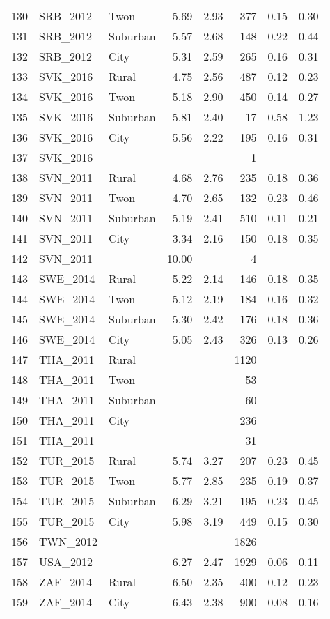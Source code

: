 \documentclass[12pt, titlepage]{article}
\begin{document}
\begin{longtable}[H]{rllrrrrr}
		130 & SRB\_2012 & Twon & 5.69 & 2.93 & 377 & 0.15 & 0.30 \\ 
		131 & SRB\_2012 & Suburban & 5.57 & 2.68 & 148 & 0.22 & 0.44 \\ 
		132 & SRB\_2012 & City & 5.31 & 2.59 & 265 & 0.16 & 0.31 \\ 
		133 & SVK\_2016 & Rural & 4.75 & 2.56 & 487 & 0.12 & 0.23 \\ 
		134 & SVK\_2016 & Twon & 5.18 & 2.90 & 450 & 0.14 & 0.27 \\ 
		135 & SVK\_2016 & Suburban & 5.81 & 2.40 &  17 & 0.58 & 1.23 \\ 
		136 & SVK\_2016 & City & 5.56 & 2.22 & 195 & 0.16 & 0.31 \\ 
		137 & SVK\_2016 &  &  &  &   1 &  &  \\ 
		138 & SVN\_2011 & Rural & 4.68 & 2.76 & 235 & 0.18 & 0.36 \\ 
		139 & SVN\_2011 & Twon & 4.70 & 2.65 & 132 & 0.23 & 0.46 \\ 
		140 & SVN\_2011 & Suburban & 5.19 & 2.41 & 510 & 0.11 & 0.21 \\ 
		141 & SVN\_2011 & City & 3.34 & 2.16 & 150 & 0.18 & 0.35 \\ 
		142 & SVN\_2011 &  & 10.00 &  &   4 &  &  \\ 
		143 & SWE\_2014 & Rural & 5.22 & 2.14 & 146 & 0.18 & 0.35 \\ 
		144 & SWE\_2014 & Twon & 5.12 & 2.19 & 184 & 0.16 & 0.32 \\ 
		145 & SWE\_2014 & Suburban & 5.30 & 2.42 & 176 & 0.18 & 0.36 \\ 
		146 & SWE\_2014 & City & 5.05 & 2.43 & 326 & 0.13 & 0.26 \\ 
		147 & THA\_2011 & Rural &  &  & 1120 &  &  \\ 
		148 & THA\_2011 & Twon &  &  &  53 &  &  \\ 
		149 & THA\_2011 & Suburban &  &  &  60 &  &  \\ 
		150 & THA\_2011 & City &  &  & 236 &  &  \\ 
		151 & THA\_2011 &  &  &  &  31 &  &  \\ 
		152 & TUR\_2015 & Rural & 5.74 & 3.27 & 207 & 0.23 & 0.45 \\ 
		153 & TUR\_2015 & Twon & 5.77 & 2.85 & 235 & 0.19 & 0.37 \\ 
		154 & TUR\_2015 & Suburban & 6.29 & 3.21 & 195 & 0.23 & 0.45 \\ 
		155 & TUR\_2015 & City & 5.98 & 3.19 & 449 & 0.15 & 0.30 \\ 
		156 & TWN\_2012 &  &  &  & 1826 &  &  \\ 
		157 & USA\_2012 &  & 6.27 & 2.47 & 1929 & 0.06 & 0.11 \\ 
		158 & ZAF\_2014 & Rural & 6.50 & 2.35 & 400 & 0.12 & 0.23 \\ 
		159 & ZAF\_2014 & City & 6.43 & 2.38 & 900 & 0.08 & 0.16 \\ 
		\hline
	\end{longtable}
\end{document}

